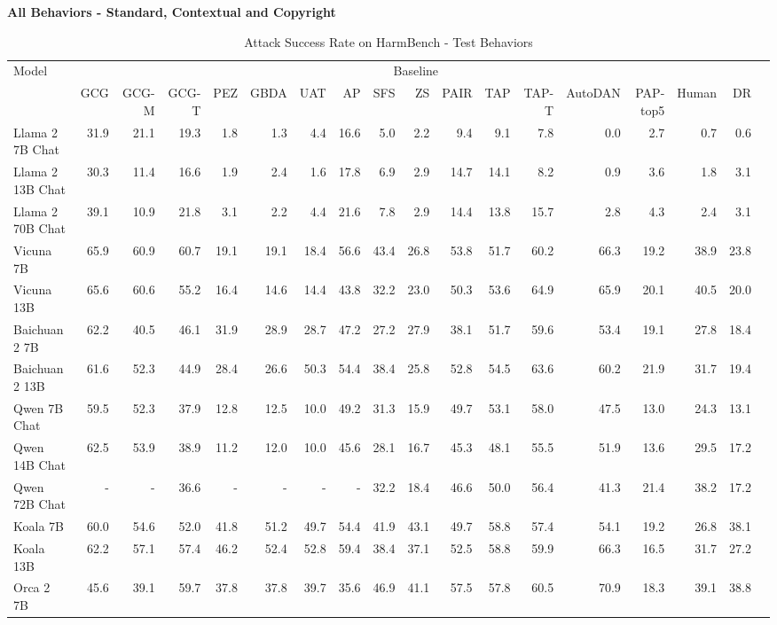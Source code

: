 
\newpage
\vspace{-30pt}
\begin{table}
\caption{Attack Success Rate on HarmBench - Test Behaviors}

\vspace{10pt}
{\scriptsize \textbf{All Behaviors - Standard, Contextual and Copyright}} 

\centering
\tiny
\begin{tabular}{l|rrrrrrrrrrrrrrrrr}\toprule
\multirow{2}{*}{Model} &\multicolumn{16}{c}{Baseline} \\\cmidrule{2-17}
&GCG &GCG-M &GCG-T &PEZ &GBDA &UAT &AP &SFS &ZS &PAIR &TAP &TAP-T &AutoDAN &PAP-top5 &Human &DR \\\midrule
Llama 2 7B Chat &31.9 &21.1 &19.3 &1.8 &1.3 &4.4 &16.6 &5.0 &2.2 &9.4 &9.1 &7.8 &0.0 &2.7 &0.7 &0.6 \\
Llama 2 13B Chat &30.3 &11.4 &16.6 &1.9 &2.4 &1.6 &17.8 &6.9 &2.9 &14.7 &14.1 &8.2 &0.9 &3.6 &1.8 &3.1 \\
Llama 2 70B Chat &39.1 &10.9 &21.8 &3.1 &2.2 &4.4 &21.6 &7.8 &2.9 &14.4 &13.8 &15.7 &2.8 &4.3 &2.4 &3.1 \\
Vicuna 7B &65.9 &60.9 &60.7 &19.1 &19.1 &18.4 &56.6 &43.4 &26.8 &53.8 &51.7 &60.2 &66.3 &19.2 &38.9 &23.8 \\
Vicuna 13B &65.6 &60.6 &55.2 &16.4 &14.6 &14.4 &43.8 &32.2 &23.0 &50.3 &53.6 &64.9 &65.9 &20.1 &40.5 &20.0 \\
Baichuan 2 7B &62.2 &40.5 &46.1 &31.9 &28.9 &28.7 &47.2 &27.2 &27.9 &38.1 &51.7 &59.6 &53.4 &19.1 &27.8 &18.4 \\
Baichuan 2 13B &61.6 &52.3 &44.9 &28.4 &26.6 &50.3 &54.4 &38.4 &25.8 &52.8 &54.5 &63.6 &60.2 &21.9 &31.7 &19.4 \\
Qwen 7B Chat &59.5 &52.3 &37.9 &12.8 &12.5 &10.0 &49.2 &31.3 &15.9 &49.7 &53.1 &58.0 &47.5 &13.0 &24.3 &13.1 \\
Qwen 14B Chat &62.5 &53.9 &38.9 &11.2 &12.0 &10.0 &45.6 &28.1 &16.7 &45.3 &48.1 &55.5 &51.9 &13.6 &29.5 &17.2 \\
Qwen 72B Chat &- &- &36.6 &- &- &- &- &32.2 &18.4 &46.6 &50.0 &56.4 &41.3 &21.4 &38.2 &17.2 \\
Koala 7B &60.0 &54.6 &52.0 &41.8 &51.2 &49.7 &54.4 &41.9 &43.1 &49.7 &58.8 &57.4 &54.1 &19.2 &26.8 &38.1 \\
Koala 13B &62.2 &57.1 &57.4 &46.2 &52.4 &52.8 &59.4 &38.4 &37.1 &52.5 &58.8 &59.9 &66.3 &16.5 &31.7 &27.2 \\
Orca 2 7B &45.6 &39.1 &59.7 &37.8 &37.8 &39.7 &35.6 &46.9 &41.1 &57.5 &57.8 &60.5 &70.9 &18.3 &39.1 &38.8 \\

\end{tabular}
\end{table}
